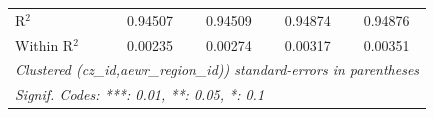 \begin{tabular}{lcccc}
   R$^2$                                           & 0.94507        & 0.94509                & 0.94874                & 0.94876\\  
   Within R$^2$                                    & 0.00235        & 0.00274                & 0.00317                & 0.00351\\  
   \midrule \midrule
   \multicolumn{5}{l}{\emph{Clustered (cz\_id,aewr\_region\_id)) standard-errors in parentheses}}\\
   \multicolumn{5}{l}{\emph{Signif. Codes: ***: 0.01, **: 0.05, *: 0.1}}\\
\end{tabular}
\par\endgroup


